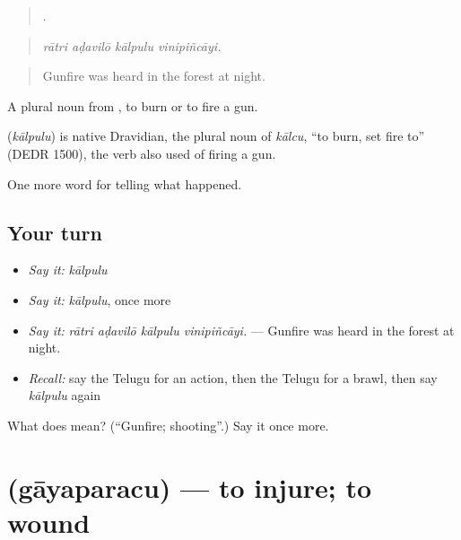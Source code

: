 \begin{quote}
   .
\end{quote}

\begin{quote}
\emph{rātri aḍavilō kālpulu vinipiñcāyi.}
\end{quote}

\begin{quote}
Gunfire was heard in the forest at night.
\end{quote}

A plural noun from , to burn or to fire a gun.

\begin{cousinweb}
\textbf{} (\emph{kālpulu}) is native Dravidian, the plural noun of \emph{kālcu}, \textquotedblleft{}to burn, set fire to\textquotedblright{} (DEDR 1500), the verb also used of firing a gun.
\end{cousinweb}

\begin{grammarlens}[title={What you've built}]
One more word for telling what happened.
\end{grammarlens}

\subsection*{Your turn}
\begin{itemize}
\raggedright
  \item \emph{Say it:} \emph{kālpulu}
  \item \emph{Say it:} \emph{kālpulu}, once more
  \item \emph{Say it:} \emph{rātri aḍavilō kālpulu vinipiñcāyi.} — Gunfire was heard in the forest at night.
  \item \emph{Recall:} say the Telugu for an action, then the Telugu for a brawl, then say \emph{kālpulu} again
\end{itemize}

\begin{tcolorbox}[breakable,colback=teal!4,colframe=teal!35!black,title={Before you move on}]
What does  mean? (\textquotedblleft{}Gunfire; shooting\textquotedblright{}.) Say it once more.
\end{tcolorbox}
\section[\texorpdfstring{\te{గాయపరచు} (gāyaparacu)}{గాయపరచు (gāyaparacu)}]{ (gāyaparacu) — to injure; to wound}

